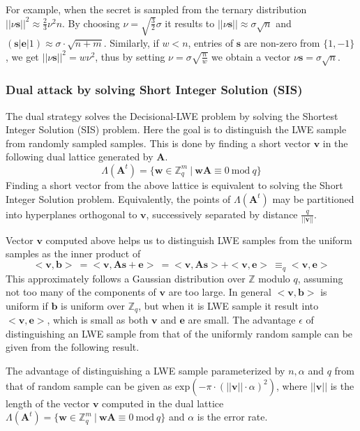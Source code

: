 For example, when the secret is sampled from the ternary distribution $||\nu\textbf{s}||^2 \approx \frac{2}{3}\nu^2n$. By choosing $\nu=\sqrt{\frac{3}{2}}\sigma$ it results to $||\nu\textbf{s}||\approx \sigma \sqrt{n}$ and $(\textbf{s}|\textbf{e}|1) \approx \sigma\cdot\sqrt{n+m}$. Similarly, if $w<n$, entries of $\textbf{s}$ are non-zero from $\{1,-1\}$, we get $||\nu\textbf{s}||^2 =w \nu^2$, thus by setting $\nu=\sigma\sqrt{\frac{n}{w}}$ we obtain a vector $\nu\textbf{s}=\sigma\sqrt{n}$.


\subsubsection{Dual attack by solving Short Integer Solution (SIS)}
\label{Text:Deal_attack}
The dual strategy solves the Decisional-LWE problem by solving the Shortest Integer Solution (SIS) problem. Here the goal is to distinguish the LWE sample from randomly sampled samples. This is done by finding a short vector $\textbf{v}$ in the following dual lattice generated by $\textbf{A}$.
\begin{equation*}
    \Lambda(\textbf{A}^t)=\{\textbf{w} \in \mathbb{Z}_q^m\ | \ \textbf{wA} \equiv 0 \ \text{mod}\ q\}
\end{equation*}
Finding a short vector from the above lattice is equivalent to solving the Short Integer Solution problem. Equivalently, the points of $\Lambda(\textbf{A}^t)$ may be partitioned into hyperplanes orthogonal to $\textbf{v}$, successively separated by distance $\frac{q}{||\textbf{v}||}$.

Vector $\textbf{v}$ computed above helps us to distinguish LWE samples from the uniform samples as the inner product of
\begin{equation*}
    <\textbf{v},\textbf{b}>\ = <\textbf{v},\textbf{As}+\textbf{e}>\ = <\textbf{v},\textbf{As}> +<\textbf{v},\textbf{e}>\ \equiv_q <\textbf{v},\textbf{e}>
\end{equation*}
This approximately follows a Gaussian distribution over $\mathbb{Z}$ modulo $q$, assuming not too many of the components of $\textbf{v}$ are too large. In general $<\textbf{v},\textbf{b}>$ is uniform if $\textbf{b}$ is uniform over $\mathbb{Z}_q$, but when it is LWE sample it result into $<\textbf{v},\textbf{e}>$, which is small as both $\textbf{v}$ and $\textbf{e}$ are small. The advantage $\epsilon$ of distinguishing an LWE sample from that of the uniformly random sample can be given from the following result.
\begin{lemma} \cite{lindner2011better}
    The advantage of distinguishing a LWE sample parameterized by $n,\alpha$ and $q$ from that of random sample can be given as $\text{exp}(-\pi\cdot(||\textbf{v}||\cdot \alpha)^2)$, where $||\textbf{v}||$ is the length of the vector $\textbf{v}$ computed in the dual lattice $\Lambda(\textbf{A}^t)=\{\textbf{w} \in \mathbb{Z}_q^m\ | \ \textbf{wA} \equiv 0 \ \text{mod}\ q\}$ and $\alpha$ is the error rate.
\end{lemma}

